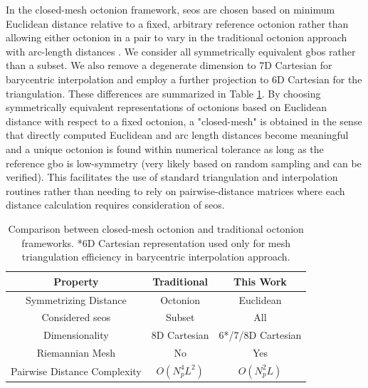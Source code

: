 \documentclass[preprint,12pt]{elsarticle}
\begin{document}
In the closed-mesh octonion framework, \glspl{seo} are chosen based on minimum Euclidean distance relative to a fixed, arbitrary reference octonion rather than allowing either octonion in a pair to vary in the traditional octonion approach with arc-length distances \cite{francisGeodesicOctonionMetric2019}. We consider all symmetrically equivalent \glspl{gbo} rather than a subset. We also remove a degenerate dimension to 7D Cartesian for barycentric interpolation and employ a further projection to 6D Cartesian for the triangulation. These differences are summarized in Table \ref{tab:closed-mesh-comparison}. By choosing symmetrically equivalent representations of octonions based on Euclidean distance with respect to a fixed octonion, a "closed-mesh" is obtained in the sense that directly computed Euclidean and arc length distances become meaningful and a unique octonion is found within numerical tolerance as long as the reference \gls{gbo} is low-symmetry (very likely based on random sampling and can be verified). This facilitates the use of standard triangulation and interpolation routines rather than needing to rely on pairwise-distance matrices where each distance calculation requires consideration of \glspl{seo}.

\begin{table}[] \label{tab:closed-mesh-comparison}
\caption{Comparison between closed-mesh octonion and traditional octonion frameworks. *6D Cartesian representation used only for mesh triangulation efficiency in barycentric interpolation approach.}
\centering
\begin{tabular}{ccc}
\hline
Property                                        & Traditional   & This Work                \\
\hline
Symmetrizing Distance                   & Octonion      & Euclidean                \\
Considered \glspl{seo}                  & Subset         & All                      \\
Dimensionality                          & 8D Cartesian  & 6*/7/8D Cartesian \\
Riemannian Mesh                         & No            & Yes                      \\
Pairwise Distance Complexity            & $O(N_p^4L^2)$ & $O(N_p^2L)$             
\end{tabular}
\end{table}
\end{document}
